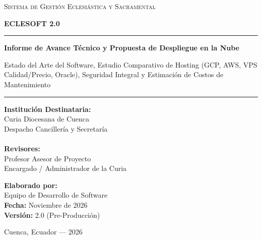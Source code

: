 \documentclass[11pt,a4paper]{article}
\begin{document}
\begin{titlepage}
    \centering
    \vspace*{1.2cm}
    {\Large \textsc{Sistema de Gestión Eclesiástica y Sacramental}\par}
    \vspace{0.3cm}
    {\Huge \bfseries \color{azulcuria} ECLESOFT 2.0\par}
    \vspace{1.2cm}
    \rule{\linewidth}{1.2pt}\par
    \vspace{0.4cm}
    {\LARGE \bfseries Informe de Avance Técnico y Propuesta de Despliegue en la Nube\par}
    \vspace{0.3cm}
    {\large Estado del Arte del Software, Estudio Comparativo de Hosting (GCP, AWS, VPS Calidad/Precio, Oracle), Seguridad Integral y Estimación de Costos de Mantenimiento\par}
    \rule{\linewidth}{1.2pt}\par
    \vspace{2.2cm}

    \begin{minipage}{0.48\textwidth}
        \textbf{Institución Destinataria:}\\
        Curia Diocesana de Cuenca\\
        Despacho Cancillería y Secretaría\\
        \vspace{0.3cm}\\
        \textbf{Revisores:}\\
        Profesor Asesor de Proyecto\\
        Encargado / Administrador de la Curia
    \end{minipage}
    \hfill
    \begin{minipage}{0.48\textwidth}
        \flushright
        \textbf{Elaborado por:}\\
        Equipo de Desarrollo de Software\\
        \textbf{Fecha:} Noviembre de 2026\\
        \textbf{Versión:} 2.0 (Pre-Producción)
    \end{minipage}

    \vfill
    {\small Cuenca, Ecuador --- 2026\par}
\end{titlepage}
\end{document}
